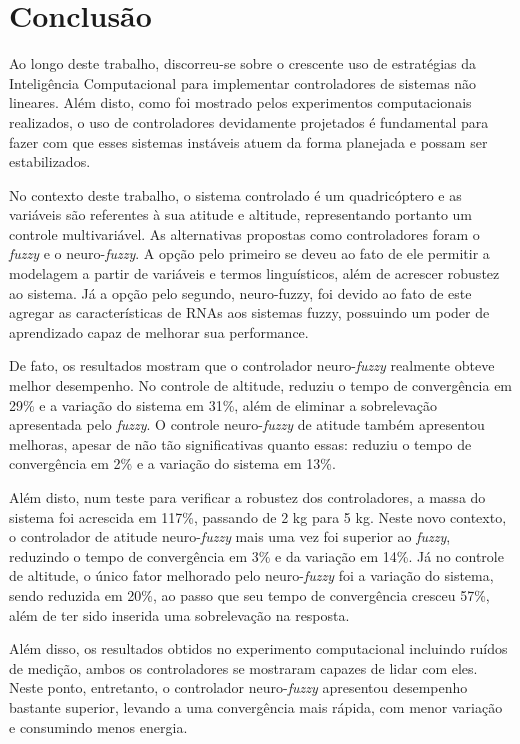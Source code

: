 %
%

\chapter{Conclusão}
\label{chap:conclusao}

Ao longo deste trabalho, discorreu-se sobre o crescente uso de estratégias da Inteligência Computacional para implementar controladores de sistemas não lineares. Além disto, como foi mostrado pelos experimentos computacionais realizados, o uso de controladores devidamente projetados é fundamental para fazer com que esses sistemas instáveis atuem da forma planejada e possam ser estabilizados.

No contexto deste trabalho, o sistema controlado é um quadricóptero e as variáveis são referentes à sua atitude e altitude, representando portanto um controle multivariável. As alternativas propostas como controladores foram o \textit{fuzzy} e o neuro-\textit{fuzzy}. A opção pelo primeiro se deveu ao fato de ele permitir a modelagem a partir de variáveis e termos linguísticos, além de acrescer robustez ao sistema. Já a opção pelo segundo, neuro-fuzzy, foi devido ao fato de este agregar as características de RNAs aos sistemas fuzzy, possuindo um poder de aprendizado capaz de melhorar sua performance.

De fato, os resultados mostram que o controlador neuro-\textit{fuzzy} realmente obteve melhor desempenho. No controle de altitude, reduziu o tempo de convergência em 29\% e a variação do sistema em 31\%, além de eliminar a sobrelevação apresentada pelo \textit{fuzzy}. O controle neuro-\textit{fuzzy} de atitude também apresentou melhoras, apesar de não tão significativas quanto essas: reduziu o tempo de convergência em 2\% e a variação do sistema em 13\%.

Além disto, num teste para verificar a robustez dos controladores, a massa do sistema foi acrescida em 117\%, passando de 2 kg para 5 kg. Neste novo contexto, o controlador de atitude neuro-\textit{fuzzy} mais uma vez foi superior ao \textit{fuzzy}, reduzindo o tempo de convergência em 3\% e da variação em 14\%. Já no controle de altitude, o único fator melhorado pelo neuro-\textit{fuzzy} foi a variação do sistema, sendo reduzida em 20\%, ao passo que seu tempo de convergência cresceu 57\%, além de ter sido inserida uma sobrelevação na resposta.

Além disso, os resultados obtidos no experimento computacional incluindo ruídos de medição, ambos os controladores se mostraram capazes de lidar com eles. Neste ponto, entretanto, o controlador neuro-\textit{fuzzy} apresentou desempenho bastante superior, levando a uma convergência mais rápida, com menor variação e consumindo menos energia.

